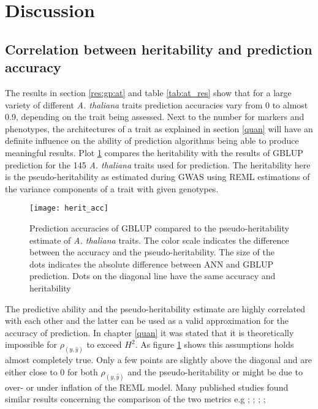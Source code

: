 \section{Discussion}\label{gpdis}
\subsection{Correlation between heritability and prediction accuracy}

The results in section \ref{res:gp:at} and table \ref{tab:at_res} show that for a large
variety of different \textit{A. thaliana} traits prediction accuracies vary from 0 to
almost 0.9, depending on the trait being assessed. Next to the number for markers and
phenotypes, the architectures of a trait as explained in section \ref{quan} will have an
definite influence on the ability of prediction algorithms being able to produce
meaningful results. Plot \ref{fig:herit_gp} compares the heritability with the results of
GBLUP prediction for the 145 \textit{A. thaliana} traits used for prediction. The
heritability here is the pseudo-heritability as estimated during GWAS using REML
estimations of the variance components of a trait with given genotypes. 

\begin{figure}[H]
 \centering \texttt{[image: herit\_acc]}
 \decoRule
 \caption[Prediction accuracies of GBLUP compared to the heritability of
 \textit{A. thaliana} traits]{Prediction accuracies of GBLUP compared to the
   pseudo-heritability estimate of \textit{A. thaliana} traits. The color scale indicates the
   difference between the accuracy and the pseudo-heritability. The size of the dots
   indicates the absolute difference between ANN and GBLUP prediction. Dots on the
   diagonal line have the same accuracy and heritability}
\label{fig:herit_gp}
\end{figure}

The predictive ability and the pseudo-heritability estimate are highly correlated with each other
and the latter can be used as a valid approximation for the accuracy of prediction. In
chapter \ref{quan} it was stated that it is theoretically impossible for
$\rho_{(y,\hat{y})}$ to exceed $H^2$. As figure \ref{fig:herit_gp} shows this assumptions
holds almost completely true. Only a few points are slightly above the diagonal and are
either close to 0 for both $\rho_{(y,\hat{y})}$ and the pseudo-heritability or might be
due to over- or under inflation of the REML model. Many published studies found similar
results concerning the comparison of the two metrics e.g \cite{kwong2017genomic}; \cite{morgante2018effect}; \cite{yap2018misestimation}; \cite{piaskowski2018genomic}; \cite{zhang2019factors}



